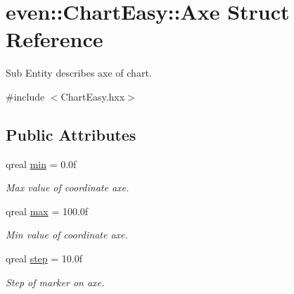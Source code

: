 \hypertarget{structeven_1_1_chart_easy_1_1_axe}{}\section{even\+:\+:Chart\+Easy\+:\+:Axe Struct Reference}
\label{structeven_1_1_chart_easy_1_1_axe}


Sub Entity describes axe of chart.  




{\ttfamily \#include $<$Chart\+Easy.\+hxx$>$}

\subsection*{Public Attributes}
\begin{DoxyCompactItemize}
\item 
\mbox{\label{structeven_1_1_chart_easy_1_1_axe_afae7b69b3a77a79725b88461890f1250}} 
qreal \mbox{\hyperlink{structeven_1_1_chart_easy_1_1_axe_afae7b69b3a77a79725b88461890f1250}{min}} = 0.\+0f
\begin{DoxyCompactList}\small\item\em Max value of coordinate axe. \end{DoxyCompactList}\item 
\mbox{\label{structeven_1_1_chart_easy_1_1_axe_a3e73915ca35468fe66748b7ddd858a95}} 
qreal \mbox{\hyperlink{structeven_1_1_chart_easy_1_1_axe_a3e73915ca35468fe66748b7ddd858a95}{max}} = 100.\+0f
\begin{DoxyCompactList}\small\item\em Min value of coordinate axe. \end{DoxyCompactList}\item 
\mbox{\label{structeven_1_1_chart_easy_1_1_axe_a28900718dea40a29758a11f96404a52e}} 
qreal \mbox{\hyperlink{structeven_1_1_chart_easy_1_1_axe_a28900718dea40a29758a11f96404a52e}{step}} = 10.\+0f
\begin{DoxyCompactList}\small\item\em Step of marker on axe. \end{DoxyCompactList}\item 
\mbox{\label{structeven_1_1_chart_easy_1_1_axe_ab65bb6cfca8feea9283f9ceb2d57626b}} 

\end{DoxyCompactItemize}
